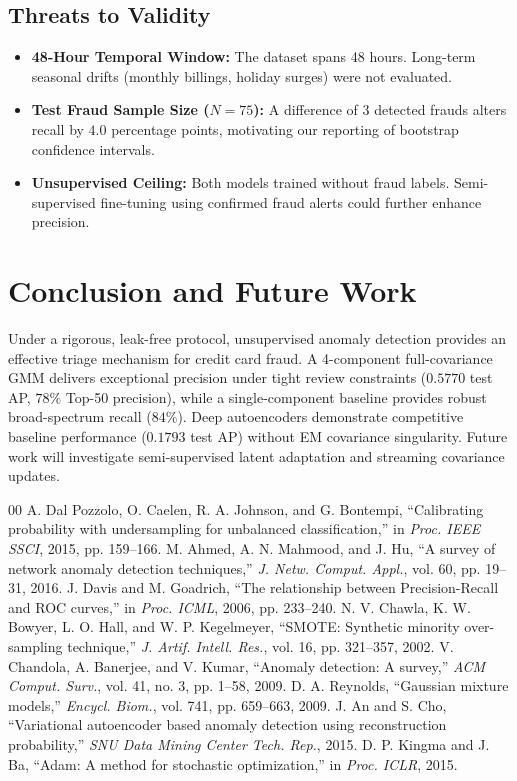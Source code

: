 \documentclass[conference]{IEEEtran}
\begin{document}
\subsection{Threats to Validity}
\begin{itemize}
    \item \textbf{48-Hour Temporal Window:} The dataset spans 48 hours. Long-term seasonal drifts (monthly billings, holiday surges) were not evaluated.
    \item \textbf{Test Fraud Sample Size ($N=75$):} A difference of 3 detected frauds alters recall by $4.0$ percentage points, motivating our reporting of bootstrap confidence intervals.
    \item \textbf{Unsupervised Ceiling:} Both models trained without fraud labels. Semi-supervised fine-tuning using confirmed fraud alerts could further enhance precision.
\end{itemize}

\section{Conclusion and Future Work}
Under a rigorous, leak-free protocol, unsupervised anomaly detection provides an effective triage mechanism for credit card fraud. A 4-component full-covariance GMM delivers exceptional precision under tight review constraints ($0.5770$ test AP, $78\%$ Top-50 precision), while a single-component baseline provides robust broad-spectrum recall ($84\%$). Deep autoencoders demonstrate competitive baseline performance ($0.1793$ test AP) without EM covariance singularity. Future work will investigate semi-supervised latent adaptation and streaming covariance updates.


\begin{thebibliography}{00}
 A. Dal Pozzolo, O. Caelen, R. A. Johnson, and G. Bontempi, ``Calibrating probability with undersampling for unbalanced classification,'' in \textit{Proc. IEEE SSCI}, 2015, pp. 159--166.
 M. Ahmed, A. N. Mahmood, and J. Hu, ``A survey of network anomaly detection techniques,'' \textit{J. Netw. Comput. Appl.}, vol. 60, pp. 19--31, 2016.
 J. Davis and M. Goadrich, ``The relationship between Precision-Recall and ROC curves,'' in \textit{Proc. ICML}, 2006, pp. 233--240.
 N. V. Chawla, K. W. Bowyer, L. O. Hall, and W. P. Kegelmeyer, ``SMOTE: Synthetic minority over-sampling technique,'' \textit{J. Artif. Intell. Res.}, vol. 16, pp. 321--357, 2002.
 V. Chandola, A. Banerjee, and V. Kumar, ``Anomaly detection: A survey,'' \textit{ACM Comput. Surv.}, vol. 41, no. 3, pp. 1--58, 2009.
 D. A. Reynolds, ``Gaussian mixture models,'' \textit{Encycl. Biom.}, vol. 741, pp. 659--663, 2009.
 J. An and S. Cho, ``Variational autoencoder based anomaly detection using reconstruction probability,'' \textit{SNU Data Mining Center Tech. Rep.}, 2015.
 D. P. Kingma and J. Ba, ``Adam: A method for stochastic optimization,'' in \textit{Proc. ICLR}, 2015.
\end{thebibliography}
\end{document}
